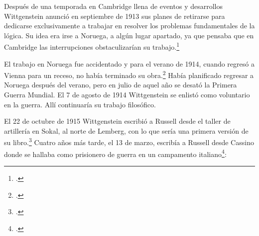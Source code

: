 Después de una temporada en Cambridge llena de eventos y desarrollos
Wittgenstein anunció en septiembre de 1913 sus planes de retirarse para
dedicarse exclusivamente a trabajar en resolver los problemas fundamentales de
la lógica. Su idea era irse a Noruega, a algún lugar apartado, ya que pensaba
que en Cambridge las interrupciones obstaculizarían su trabajo.\footcite[cap. 4
loc 1844]{monk} 

El trabajo en Noruega fue accidentado y para el verano de 1914, cuando regresó a
Vienna para un receso, no había terminado su obra.\footcite[cap. 5 loc
2154]{monk} Había planificado regresar a Noruega después del verano, pero en julio de
aquel año se desató la Primera Guerra Mundial. El 7 de agosto de 1914
Wittgenstein se enlistó como voluntario en la guerra. Allí continuaría su 
trabajo filosófico. 

El 22 de octubre de 1915 Wittgenstein escribió a Russell
desde el taller de artillería en Sokal, al norte de Lemberg, con lo que sería
una primera versión de su libro.\footcite[cf. p.84]{cambridgeletters} Cuatro años más
tarde, el 13 de marzo, escribía a Russell desde Cassino donde se hallaba como
prisionero de guerra en un campamento italiano\footcite[cf. p.268]{mcguinness}:

